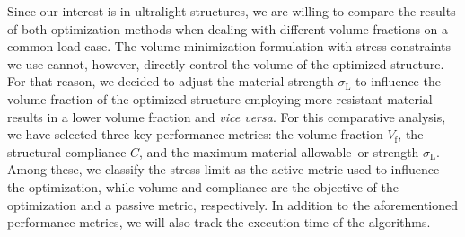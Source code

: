 Since our interest is in ultralight structures, we are willing to compare the results of both optimization methods when dealing with different volume fractions on a common load case. The volume minimization formulation with stress constraints we use cannot, however, directly control the volume of the optimized structure. For that reason, we decided to adjust the material strength $\sigma_\text{L}$ to influence the volume fraction of the optimized structure \ie employing more resistant material results in a lower volume fraction and \textit{vice versa}. For this comparative analysis, we have selected three key performance metrics: the volume fraction $V_\text{f}$, the structural compliance $C$, and the maximum material allowable--or strength $\sigma_\text{L}$. Among these, we classify the stress limit as the active metric used to influence the optimization, while volume and compliance are the objective of the optimization and a passive metric, respectively. In addition to the aforementioned performance metrics, we will also track the execution time of the algorithms.

